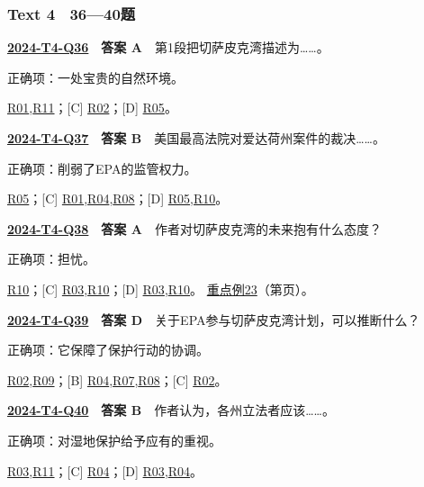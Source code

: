 \documentclass[11pt,a4paper]{article}
\begin{document}
\subsubsection{Text 4　36—40题}
\label{idx-2024-T4-Q36}
\noindent\textbf{\href{https://zj139.github.io/math-notes/english/205b52b675af679e70500e87/\#q36}{2024-T4-Q36}　答案 A}　第1段把切萨皮克湾描述为……。\par\nopagebreak
\noindent 正确项：一处宝贵的自然环境。\par\nopagebreak
\noindent [B] \hyperref[cat-R01]{R01},\hyperref[cat-R11]{R11}；[C] \hyperref[cat-R02]{R02}；[D] \hyperref[cat-R05]{R05}。
\par\smallskip
{}\label{idx-2024-T4-Q37}
\noindent\textbf{\href{https://zj139.github.io/math-notes/english/205b52b675af679e70500e87/\#q37}{2024-T4-Q37}　答案 B}　美国最高法院对爱达荷州案件的裁决……。\par\nopagebreak
\noindent 正确项：削弱了EPA的监管权力。\par\nopagebreak
\noindent [A] \hyperref[cat-R05]{R05}；[C] \hyperref[cat-R01]{R01},\hyperref[cat-R04]{R04},\hyperref[cat-R08]{R08}；[D] \hyperref[cat-R05]{R05},\hyperref[cat-R10]{R10}。
\par\smallskip
{}\label{idx-2024-T4-Q38}
\noindent\textbf{\href{https://zj139.github.io/math-notes/english/205b52b675af679e70500e87/\#q38}{2024-T4-Q38}　答案 A}　作者对切萨皮克湾的未来抱有什么态度？\par\nopagebreak
\noindent 正确项：担忧。\par\nopagebreak
\noindent [B] \hyperref[cat-R10]{R10}；[C] \hyperref[cat-R03]{R03},\hyperref[cat-R10]{R10}；[D] \hyperref[cat-R03]{R03},\hyperref[cat-R10]{R10}。
\hyperref[case-2024-T4-Q38]{重点例23}（第\pageref{case-2024-T4-Q38}页）。
\par\smallskip
{}\label{idx-2024-T4-Q39}
\noindent\textbf{\href{https://zj139.github.io/math-notes/english/205b52b675af679e70500e87/\#q39}{2024-T4-Q39}　答案 D}　关于EPA参与切萨皮克湾计划，可以推断什么？\par\nopagebreak
\noindent 正确项：它保障了保护行动的协调。\par\nopagebreak
\noindent [A] \hyperref[cat-R02]{R02},\hyperref[cat-R09]{R09}；[B] \hyperref[cat-R04]{R04},\hyperref[cat-R07]{R07},\hyperref[cat-R08]{R08}；[C] \hyperref[cat-R02]{R02}。
\par\smallskip
{}\label{idx-2024-T4-Q40}
\noindent\textbf{\href{https://zj139.github.io/math-notes/english/205b52b675af679e70500e87/\#q40}{2024-T4-Q40}　答案 B}　作者认为，各州立法者应该……。\par\nopagebreak
\noindent 正确项：对湿地保护给予应有的重视。\par\nopagebreak
\noindent [A] \hyperref[cat-R03]{R03},\hyperref[cat-R11]{R11}；[C] \hyperref[cat-R04]{R04}；[D] \hyperref[cat-R03]{R03},\hyperref[cat-R04]{R04}。
\par\smallskip
\clearpage\setlength{\parskip}{1pt}
\end{document}

